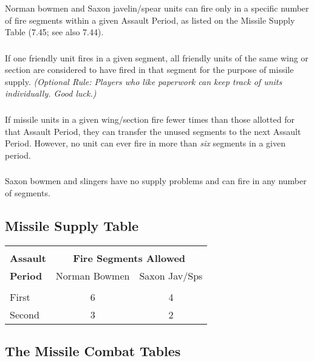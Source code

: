 \subsubsection[Fire Segment]{} Norman bowmen and Saxon javelin/spear units can fire only in a specific number of fire segments within a given Assault Period, as listed on the Missile Supply Table (7.45; see also 7.44).

\subsubsection[One and All]{} If one friendly unit fires in a given segment, all friendly units of the same wing or section are considered to have fired in that segment for the purpose of missile supply. \textit{(Optional Rule: Players who like paperwork can keep track of units individually. Good luck.)}

\subsubsection[Saving Ammo]{} If missile units in a given wing/section fire fewer times than those allotted for that Assault Period, they can transfer the unused segments to the next Assault Period. However, no unit can ever fire in more than \textit{six} segments in a given period.

\subsubsection[Saxon Bowmen]{} Saxon bowmen and slingers have no supply problems and can fire in any number of segments.

\subsection{Missile Supply Table}

\begin{tabular}{ |l|cc| }
  \hline & & \\[-2.0ex]
  \textbf{Assault} & \multicolumn{2}{c|}{\textbf{Fire Segments Allowed}} \\
  \textbf{Period} & Norman Bowmen & Saxon Jav/Sps \\
  \hline & &\\ [-2.0ex]
  First & 6 & 4 \\
  Second & 3 & 2 \\
  \hline
\end{tabular}

\subsection{The Missile Combat Tables}
